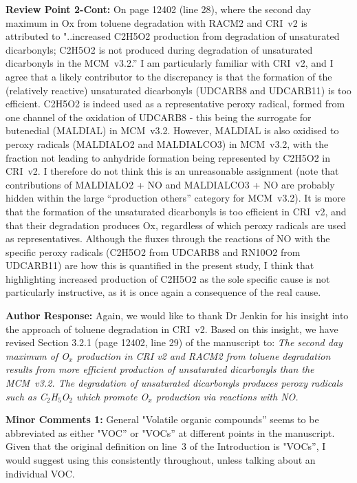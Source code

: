 \documentclass{article}
\begin{document}
\textbf{Review Point 2-Cont:} On page 12402 (line 28), where the second day maximum in Ox from toluene degradation with RACM2 and CRI~v2 is attributed to "..increased C2H5O2 production from degradation of unsaturated dicarbonyls; C2H5O2 is not produced during degradation of unsaturated dicarbonyls in the MCM~v3.2.'' I am particularly familiar with CRI~v2, and I agree that a likely contributor to the discrepancy is that the formation of the (relatively reactive) unsaturated dicarbonyls (UDCARB8 and UDCARB11) is too efficient. C2H5O2 is indeed used as a representative peroxy radical, formed from one channel of the oxidation of UDCARB8 - this being the surrogate for butenedial (MALDIAL) in MCM~v3.2. However, MALDIAL is also oxidised to peroxy radicals (MALDIALO2 and MALDIALCO3) in MCM~v3.2, with the fraction not leading to anhydride formation being represented by C2H5O2 in CRI~v2. I therefore do not think this is an unreasonable assignment (note that contributions of MALDIALO2 + NO and MALDIALCO3 + NO are probably hidden within the large ``production others'' category for MCM~v3.2). It is more that the formation of the unsaturated dicarbonyls is too efficient in CRI~v2, and that their degradation produces Ox, regardless of which peroxy radicals are used as representatives. Although the fluxes through the reactions of NO with the specific peroxy radicals (C2H5O2 from UDCARB8 and RN10O2 from UDCARB11) are how this is quantified in the present study, I think that highlighting increased production of C2H5O2 as the sole specific cause is not particularly instructive, as it is once again a consequence of the real cause.

\textbf{Author Response:} Again, we would like to thank Dr Jenkin for his insight into the approach of toluene degradation in CRI~v2.
Based on this insight, we have revised Section 3.2.1 (page 12402, line 29) of the manuscript to:
\textit{The second day maximum of O$_{x}$ production in CRI v2 and RACM2 from toluene degradation results from more efficient production of unsaturated dicarbonyls than the MCM~v3.2. The degradation of unsaturated dicarbonyls produces peroxy radicals such as C$_2$H$_5$O$_2$ which promote O$_{x}$ production via reactions with NO.}

\textbf{Minor Comments 1:} General "Volatile organic compounds'' seems to be abbreviated as either "VOC'' or "VOCs'' at different points in the manuscript. Given that the original definition on line~3 of the Introduction is "VOCs'', I would suggest using this consistently throughout, unless talking about an individual VOC.
\end{document}
